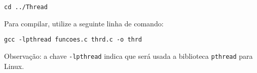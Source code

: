 \begin{lstlisting}[style=MyBashStyle]
cd ../Thread
\end{lstlisting}

Para compilar, utilize a seguinte linha de comando:

\begin{lstlisting}[style=MyBashStyle]
gcc -lpthread funcoes.c thrd.c -o thrd
\end{lstlisting}

Observação: a chave \texttt{-lpthread} indica que será usada a biblioteca \texttt{pthread} para Linux.